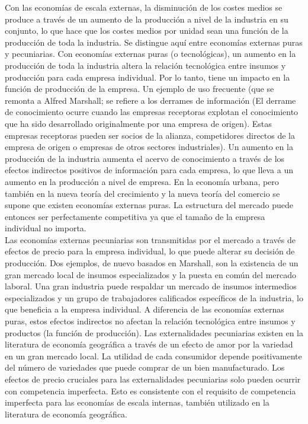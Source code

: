 Con las economías de escala externas, la disminución de los costes medios se produce a través de un aumento de la producción a nivel de la industria en su conjunto, lo que hace que los costes medios por unidad sean una función de la producción de toda la industria. Se distingue aquí entre economías externas puras y pecuniarias. Con economías externas puras (o tecnológicas), un aumento en la producción de toda la industria altera la relación tecnológica entre insumos y producción para cada empresa individual. Por lo tanto, tiene un impacto en la función de producción de la empresa. Un ejemplo de uso frecuente (que se remonta a Alfred Marshall; se refiere a los derrames de información (El derrame de conocimiento ocurre cuando las empresas receptoras explotan el conocimiento que ha sido desarrollado originalmente por una empresa de origen). Estas empresas receptoras pueden ser socios de la alianza, competidores directos de la empresa de origen o empresas de otros sectores industriales). Un aumento en la producción de la industria aumenta el acervo de conocimiento a través de los efectos indirectos positivos de información para cada empresa, lo que lleva a un aumento en la producción a nivel de empresa. En la economía urbana, pero también en la nueva teoría del crecimiento y la nueva teoría del comercio se supone que existen economías externas puras. La estructura del mercado puede entonces ser perfectamente competitiva ya que el tamaño de la empresa individual no importa.\\
Las economías externas pecuniarias son transmitidas por el mercado a través de efectos de precio para la empresa individual, lo que puede alterar su decisión de producción. Dos ejemplos, de nuevo basados en Marshall, son la existencia de un gran mercado local de insumos especializados y la puesta en común del mercado laboral. Una gran industria puede respaldar un mercado de insumos intermedios especializados y un grupo de trabajadores calificados específicos de la industria, lo que beneficia a la empresa individual. A diferencia de las economías externas puras, estos efectos indirectos no afectan la relación tecnológica entre insumos y productos (la función de producción). Las externalidades pecuniarias existen en la literatura de economía geográfica a través de un efecto de amor por la variedad en un gran mercado local. La utilidad de cada consumidor depende positivamente del número de variedades que puede comprar de un bien manufacturado. Los efectos de precio cruciales para las externalidades pecuniarias solo pueden ocurrir con competencia imperfecta. Esto es consistente con el requisito de competencia imperfecta para las economías de escala internas, también utilizado en la literatura de economía geográfica. \\
